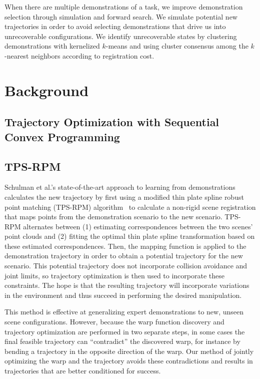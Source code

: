 \documentclass{article}
\begin{document}
When there are multiple demonstrations of a task, we improve demonstration selection through simulation and forward search. We simulate potential new trajectories in order to avoid selecting demonstrations that drive us into unrecoverable configurations. We identify unrecoverable states by clustering demonstrations with kernelized $k$-means and using cluster consensus among the $k$-nearest neighbors according to registration cost.

\section{Background}

\subsection{Trajectory Optimization with Sequential Convex Programming}

\subsection{TPS-RPM}

Schulman et al.'s state-of-the-art approach to learning from demonstrations~\cite{Schulmanetal_ISRR2013} calculates the new trajectory by first using a modified thin plate spline robust point matching (TPS-RPM) algorithm~\cite{ChuiR00} to calculate a non-rigid scene registration that maps points from the demonstration scenario to the new scenario. TPS-RPM alternates between (1) estimating correspondences between the two scenes' point clouds and (2) fitting the optimal thin plate spline transformation based on these estimated correspondences. Then, the mapping function is applied to the demonstration trajectory in order to obtain a potential trajectory for the new scenario. This potential trajectory does not incorporate collision avoidance and joint limits, so trajectory optimization is then used to incorporate these constraints. The hope is that the resulting trajectory will incorporate variations in the environment and thus succeed in performing the desired manipulation.

This method is effective at generalizing expert demonstrations to new, unseen scene configurations. However, because the warp function discovery and trajectory optimization are performed in two separate steps, in some cases the final feasible trajectory can ``contradict'' the discovered warp, for instance by bending a trajectory in the opposite direction of the warp. Our method of jointly optimizing the warp and the trajectory avoids these contradictions and results in trajectories that are better conditioned for success.
\end{document}
